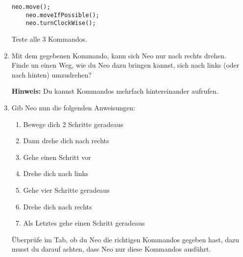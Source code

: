 \begin{enumerate}
        \begin{lstlisting}[firstnumber=20]
    neo.move();
    neo.moveIfPossible();
    neo.turnClockWise();
        \end{lstlisting}

        Teste alle 3 Kommandos.\\
        \item Mit dem gegebenen Kommando, kann sich Neo nur nach rechts drehen.\\
        Finde un einen Weg, wie du Neo dazu bringen kannst, sich nach links (oder nach hinten) umzudrehen?
        
        \textbf{Hinweis:} Du kannst Kommandos mehrfach hintereinander aufrufen.
        \item Gib Neo nun die folgenden Anweisungen:
        
        {
\begin{enumerate}
\item Bewege dich 2 Schritte geradeaus
\item Dann drehe dich nach rechts
\item Gehe einen Schritt vor
\item Drehe dich nach links
\item Gehe vier Schritte geradeaus
\item Drehe dich nach rechts
\item Als Letztes gehe einen Schritt geradeaus
\end{enumerate}
}

Überprüfe im  Tab, ob du Neo die richtigen Kommandos gegeben hast, dazu musst du darauf achten, dass Neo nur diese Kommandos ausführt.
\end{enumerate}

